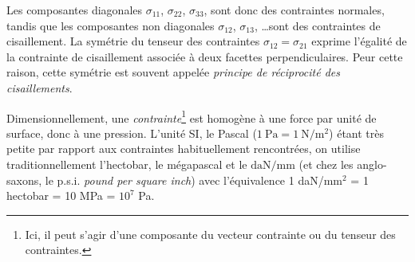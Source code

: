 Les composantes diagonales $\sigma_{11}$, $\sigma_{22}$, $\sigma_{33}$, sont donc des contraintes normales, tandis que les composantes non diagonales $\sigma_{12}$, $\sigma_{13}$, \dots sont des contraintes de cisaillement.
La symétrie du tenseur des contraintes $\sigma_{12} = \sigma_{21}$ exprime l'égalité de la contrainte de cisaillement associée à deux facettes perpendiculaires.
Peur cette raison, cette symétrie est souvent appelée \emph{principe de réciprocité des cisaillements}.

Dimensionnellement, une \emph{contrainte}\footnote{Ici, il peut s'agir d'une composante du vecteur contrainte ou du tenseur des contraintes.} est homogène à une force par unité de surface, donc à une pression.
L'unité SI, le Pascal ($1~\text{Pa} = 1~\text{N}/\text{m}^2$) étant très petite par rapport aux contraintes habituellement rencontrées, on utilise traditionnellement l'hectobar, le mégapascal et le $\text{daN}/\text{mm}$ (et chez les anglo-saxons, le p.s.i. \textit{pound per square inch})
avec l'équivalence 1 daN/mm$^2$ = 1 hectobar = 10 MPa = $10^7$ Pa.

